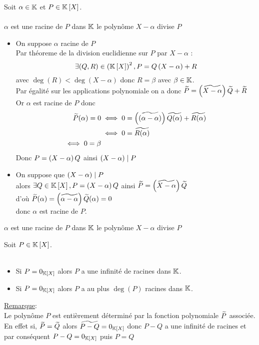 \begin{defprop}
    Soit \(\alpha \in \mathbb{K}\) et \( P \in \mathbb{K} \left[X\right]\).\\~\\
    \(\alpha\) est une racine de \(P\) dans \(\mathbb{K}\) \ssi le polynôme \(X - \alpha\) divise \(P\)
\end{defprop}
\begin{dem}
    \begin{itemize}
        \item \impdir On suppose \(\alpha\) racine de \(P\) \\
        Par théoreme de la division euclidienne sur \(P\) par \(X - \alpha\) :
        \[\exists (Q,R) \in \left(\mathbb{K} \left[X\right]\right)^2 , P = Q\left(X - \alpha\right) + R\]
        avec \(\deg(R) < \deg(X-\alpha)\) donc \(R = \beta\) avec \(\beta \in \mathbb{K}\).\\
        Par égalité sur les applications polynomiale on a donc \(\widetilde{P} = \left(\widetilde{X - \alpha}\right)\widetilde{Q} + \widetilde{R}\) \\
        Or \(\alpha\) est racine de \(P\) donc \begin{align*}
            \widetilde{P}(\alpha) = 0 &\iff 0 = \left(\widetilde{(\alpha - \alpha)}\right)\widetilde{Q(\alpha)} + \widetilde{R(\alpha)}\\
            &\iff 0 = \widetilde{R(\alpha)}\\
            \iff 0 = \beta
        \end{align*}
        Donc \(P = \left(X - \alpha\right)Q\) ainsi \(\left(X- \alpha\right) \mid P\)
        \item \imprec   On suppose que \(\left(X - \alpha\right) \mid P\) \\
        alors \(\exists Q \in \mathbb{K} \left[X\right], P = \left(X-\alpha\right)Q\) ainsi \(\widetilde{P} = \left(\widetilde{X - \alpha}\right)\widetilde{Q}\) \\
        d'où \(\widetilde{P}(\alpha) = \left(\widetilde{\alpha - \alpha}\right)\widetilde{Q}(\alpha) = 0\)\\
        donc \(\alpha\) est racine de \(P\). 
    \end{itemize}
    \conclusion \(\alpha\) est une racine de \(P\) dans \(\mathbb{K}\) \ssi le polynôme \(X - \alpha\) divise \(P\)
\end{dem}
\begin{defprop}
    Soit \(P \in \mathbb{K} \left[X\right]\).\\~\\
    \begin{itemize}
        \item Si \(P=0_{\mathbb{K} \left[X\right]}\) alors \(P\) a une infinité de racines dans \(\mathbb{K}\).\\
        \item Si \(P = 0 _{\mathbb{K}\left[X\right]}\) alors \(P\) a au plus \(\deg(P)\) racines dans \(\mathbb{K}\).
    \end{itemize}
    \underline{Remarque}:\\
    Le polynôme \(P\) est entièrement déterminé par la fonction polynomiale \(\widetilde{P}\) associée. En effet si, \(\widetilde{P} = \widetilde{Q}\) alors \(\widetilde{P-Q} = 0_{\mathbb{K} \left[X\right]}\) donc \(P-Q\) a une infinité de racines et par conséquent \(P-Q = 0_{\mathbb{K} \left[X\right]}\) puis \(P = Q\) 
\end{defprop}
